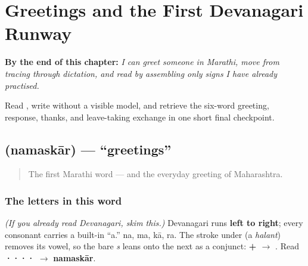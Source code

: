 
\chapter{Greetings and the First Devanagari Runway}
\label{ch:greetings}

\begin{chapteropening}
\textbf{By the end of this chapter:} \emph{I can greet someone in Marathi, move  from tracing through dictation, and read  by assembling only signs I have already practised.}

Read , write  without a visible model, and retrieve the six-word greeting, response, thanks, and leave-taking exchange in one short final checkpoint.
\end{chapteropening}

\section[namaskar]{ (namaskār) — \textquotedblleft{}greetings\textquotedblright{}}

\label{lesson:MR-C01-namaskar}



\begin{quote}
The first Marathi word — and the everyday greeting of Maharashtra.
\end{quote}

\subsection*{The letters in this word}
\emph{(If you already read Devanagari, skim this.)} Devanagari runs \textbf{left to right}; every consonant carries a built-in \textquotedblleft{}a.\textquotedblright{} \textbf{} na, \textbf{} ma, \textbf{} kā, \textbf{} ra. The stroke under \textbf{} (a \emph{halant}) removes its vowel, so the bare \emph{s} leans onto the next as a conjunct: \textbf{ +  $\to$ }. Read \textbf{····} $\to$ \textbf{namaskār}.

